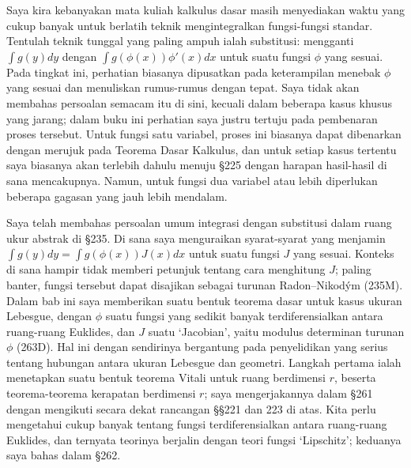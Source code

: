 
\def\diam{\mathop{\text{diam}}}
\def\dist{\mathop{\text{dist}}}

\def\chaptername{Perubahan Variabel dalam Integral}
\def\chaptername{Perubahan variabel dalam integral}

Saya kira kebanyakan mata kuliah kalkulus dasar masih menyediakan waktu
yang cukup banyak untuk berlatih teknik mengintegralkan fungsi-fungsi
standar. Tentulah teknik tunggal yang paling ampuh ialah substitusi:
mengganti $\int g(y)dy$ dengan $\int g(\phi(x))\phi'(x)dx$ untuk suatu
fungsi $\phi$ yang sesuai. Pada tingkat ini, perhatian biasanya dipusatkan
pada keterampilan menebak $\phi$ yang sesuai dan menuliskan rumus-rumus
dengan tepat. Saya tidak akan membahas persoalan semacam itu di sini,
kecuali dalam beberapa kasus khusus yang jarang; dalam buku ini perhatian
saya justru tertuju pada pembenaran proses tersebut. Untuk fungsi satu
variabel, proses ini biasanya dapat dibenarkan dengan merujuk pada Teorema
Dasar Kalkulus, dan untuk setiap kasus tertentu saya biasanya akan terlebih
dahulu menuju \S225 dengan harapan hasil-hasil di sana mencakupnya. Namun,
untuk fungsi dua variabel atau lebih diperlukan beberapa gagasan yang jauh
lebih mendalam.

Saya telah membahas persoalan umum integrasi dengan substitusi dalam ruang
ukur abstrak di \S235. Di sana saya menguraikan syarat-syarat yang menjamin
$\int g(y)dy=\int g(\phi(x))J(x)dx$ untuk suatu fungsi $J$ yang sesuai.
Konteks di sana hampir tidak memberi petunjuk tentang cara menghitung $J$;
paling banter, fungsi tersebut dapat disajikan sebagai turunan
Radon--Nikod\'ym (235M).
Dalam bab ini saya memberikan suatu bentuk teorema dasar untuk kasus ukuran
Lebesgue, dengan $\phi$ suatu fungsi yang sedikit banyak terdiferensialkan
antara ruang-ruang Euklides, dan $J$ suatu `Jacobian', yaitu modulus
determinan turunan $\phi$ (263D). Hal ini dengan sendirinya bergantung pada
penyelidikan yang serius tentang hubungan antara ukuran Lebesgue dan
geometri. Langkah pertama ialah menetapkan suatu bentuk teorema Vitali untuk
ruang berdimensi $r$, beserta teorema-teorema kerapatan berdimensi $r$;
saya mengerjakannya dalam \S261 dengan mengikuti secara dekat rancangan
\S\S221 dan 223 di atas. Kita perlu mengetahui cukup banyak tentang fungsi
terdiferensialkan antara ruang-ruang Euklides, dan ternyata teorinya
berjalin dengan teori fungsi `Lipschitz'; keduanya saya bahas dalam \S262.

